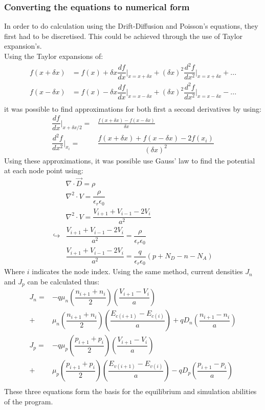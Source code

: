 \documentclass[titlepage]{article}
\begin{document}
\subsubsection{Converting the equations to numerical form}\label{sec:Meth:Mic:eqn}
In order to do calculation using the Drift-Diffusion and Poisson's equations, they first had to be discretised. This could be achieved through the use of Taylor expansion's.\cite{Nkonga}\cite{ECE606}\\
Using the Taylor expansions of:
\begin{eqnarray}
	f(x+\delta x) &= f(x) + \delta x\dfrac{df}{dx}\Big|_{x = x+\delta x} + (\delta x)^2 \dfrac{d^2f}{dx^2}\Big|_{x = x+\delta x} + ...\\
	f(x-\delta x) &= f(x) - \delta x\dfrac{df}{dx}\Big|_{x = x-\delta x} + (\delta x)^2 \dfrac{d^2f}{dx^2}\Big|_{x = x-\delta x} - ...\\
\end{eqnarray}
it was possible to find approximations for both first a second derivatives by using:
\begin{eqnarray}
	\dfrac{df}{dx}\Big|_{x+\delta x/2} =& \frac{f(x+\delta x)-f(x-\delta x)}{\delta x}\\
	\dfrac{d^2f}{dx^2}\Big|_{x_i} =&  \dfrac{f(x+\delta x) + f(x-\delta x) - 2f(x_i)}{(\delta x)^2} 
\end{eqnarray}
Using these approximations, it was possible use Gauss' law to find the potential at each node point using:\cite{ECE606}
\begin{eqnarray}
	&\nabla\cdot\vec{D} = \rho \\
	&\nabla^2 \cdot V = \dfrac{\rho}{\epsilon_r \epsilon_0} \\
	&\nabla^2 \cdot V = \dfrac{V_{i+1}+V_{i-1}-2V_i}{a^2} \\
	\hookrightarrow & \dfrac{V_{i+1}+V_{i-1}-2V_i}{a^2} = \dfrac{\rho}{\epsilon_r \epsilon_0}\\
	& \dfrac{V_{i+1}+V_{i-1}-2V_i}{a^2} = \dfrac{q}{\epsilon_r \epsilon_0}(p+N_D-n-N_A)
\end{eqnarray}
Where $i$ indicates the node index. Using the same method, current densities $J_n$ and $J_p$ can be calculated thus:
\begin{eqnarray}
	J_n =& -q\mu_n(\dfrac{n_{i+1}+n_{i}}{2})(\dfrac{V_{i+1}-V_{i}}{a})\\
	 +& \mu_n (\dfrac{n_{i+1}+n_{i}}{2})(\dfrac{E_{c(i+1)}-E_{c(i)}}{a}) + qD_n(\dfrac{n_{i+1}-n_{i}}{a}) \\
	J_p =& -q\mu_p(\dfrac{p_{i+1}+p_{i}}{2})(\dfrac{V_{i+1}-V_{i}}{a})\\
	 +& \mu_p (\dfrac{p_{i+1}+p_{i}}{2})(\dfrac{E_{v(i+1)}-E_{v(i)}}{a}) - qD_p(\dfrac{p_{i+1}-p_{i}}{a}) \\
\end{eqnarray}
These three equations form the basis for the equilibrium and simulation abilities of the program.
\end{document}
